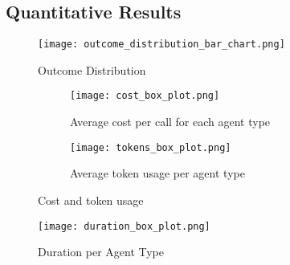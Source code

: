 \begin{comment}
Results should be clearly displayed and should provide a suitable representation of your results for the points you wish to make.
Graphs should be labelled in a legible font. If more than one result is displayed in the same graph, then these should be clearly marked.
Please choose carefully rather than presenting every result. Too much information is hard to read and often hides the key information you wish to present. Make use of statistical methods when presenting results, where possible to strengthen the results.
Further, the format of the presentation of results should be chosen based on what issues in the results you wish to highlight.
You may wish to present a subset in the experimental section and provide additional results in an appendix.
Point out specifics here but save the overall/general discussion to the Discussion chapter.
\end{comment}

\subsection{Quantitative Results}
\label{subsec:quantitative-results}

\begin{figure}[htbp]
    \centering
    \texttt{[image: outcome\_distribution\_bar\_chart.png]}
    \caption{Outcome Distribution}
    \label{fig:outcome-distribution}
\end{figure}

\begin{figure}[htbp]
    \centering
    \begin{subfigure}[b]{0.48\textwidth}
        \centering
        \texttt{[image: cost\_box\_plot.png]}
        \caption{Average cost per call for each agent type}
        \label{fig:cost-box-plot}
    \end{subfigure}
    \hfill
    \begin{subfigure}[b]{0.48\textwidth}
        \centering
        \texttt{[image: tokens\_box\_plot.png]}
        \caption{Average token usage per agent type}
        \label{fig:tokens-box-plot}
    \end{subfigure}
    \caption{Cost and token usage}
    \label{fig:cost-and-tokens}
\end{figure}

\begin{figure}[htbp]
    \centering
    \texttt{[image: duration\_box\_plot.png]}
    \caption{Duration per Agent Type}
    \label{fig:duration-box-plot}
\end{figure}

